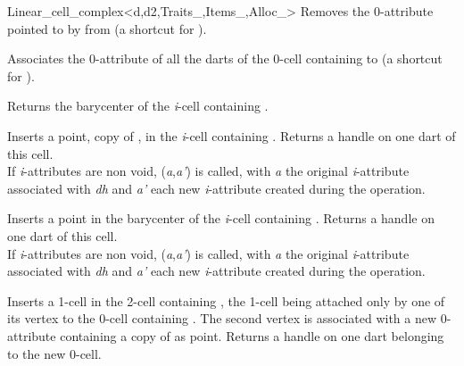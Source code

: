 \begin{ccRefClass}{Linear_cell_complex<d,d2,Traits_,Items_,Alloc_>}
{Removes the 0-attribute pointed to by  from 
  (a shortcut for ).
}

{Associates the 0-attribute of all the darts of the 0-cell 
  containing  to 
  (a shortcut for ).
}


{Returns the barycenter of the \emph{i}-cell containing .
}

{Inserts a point, copy of , in the \emph{i}-cell containing .
  Returns a handle on one dart of this cell.  
  \\
    If \emph{i}-attributes are non void, 
    (\emph{a},\emph{a'}) is called, 
    with \emph{a} the original \emph{i}-attribute associated
    with \emph{dh} and \emph{a'} each new \emph{i}-attribute created during the operation.
}

{Inserts a point in the barycenter of the \emph{i}-cell containing .
  Returns a handle on one dart of this cell.  
  \\
    If \emph{i}-attributes are non void, 
    (\emph{a},\emph{a'}) is called,
    with \emph{a} the original \emph{i}-attribute associated
    with \emph{dh} and \emph{a'} each new \emph{i}-attribute created during the operation.
}

{Inserts a 1-cell in the 2-cell containing , the 1-cell
  being attached only by one of its vertex to the 0-cell containing .
  The second vertex is associated with a new 0-attribute containing a copy of
   as point. Returns a handle on one dart belonging to the new 0-cell.
}


\end{ccRefClass}
